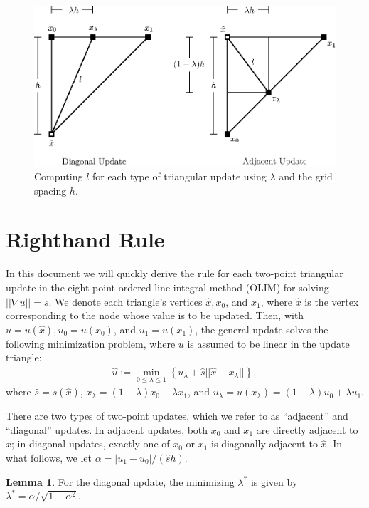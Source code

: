 \documentclass{article}
\theoremstyle{definition}
\newtheorem{lemma}{Lemma}
\begin{document}
\begin{figure}[h]
  \centering
  \includegraphics{computing-l.eps}
  \caption{Computing $l$ for each type of triangular update using $\lambda$ and the grid spacing $h$.}
  \label{fig:computing-l}
\end{figure}

\section{Righthand Rule}

In this document we will quickly derive the rule for each two-point
triangular update in the eight-point ordered line integral method
(OLIM) for solving $||\nabla u|| = s$. We denote each triangle's
vertices $\hat{x}, x_0$, and $x_1$, where $\hat{x}$ is the vertex
corresponding to the node whose value is to be updated. Then, with
$\hat{u} = u(\hat{x}), u_0 = u(x_0)$, and $u_1 = u(x_1)$, the general
update solves the following minimization problem, where $u$ is assumed
to be linear in the update triangle:
\begin{align*}
  \hat{u} := \min_{0 \leq \lambda \leq 1} \left\{ u_\lambda + \hat{s} ||\hat{x} - x_\lambda||\right\},
\end{align*}
where $\hat{s} = s(\hat{x})$, $x_\lambda = (1 - \lambda) x_0 + \lambda x_1$, and
$u_\lambda = u(x_\lambda) = (1 - \lambda)u_0 + \lambda u_1$.

There are two types of two-point updates, which we refer to as
``adjacent'' and ``diagonal'' updates. In adjacent updates, both $x_0$
and $x_1$ are directly adjacent to $\hat{x}$; in diagonal updates,
exactly one of $x_0$ or $x_1$ is diagonally adjacent to $\hat{x}$. In
what follows, we let $\alpha = |u_1 - u_0|/(\hat{s} h)$.

\begin{lemma}\label{lemma:rhr-diagonal-update}
  For the diagonal update, the minimizing $\lambda^*$ is given by
  $\lambda^* = \alpha/\sqrt{1 - \alpha^2}$.
\end{lemma}
\end{document}
